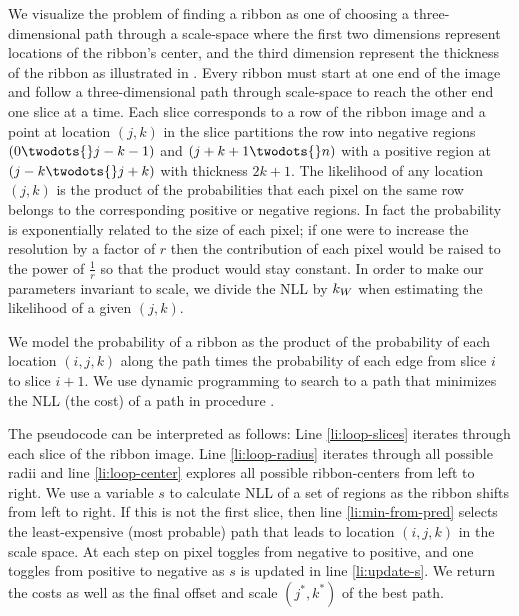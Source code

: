 We visualize the problem of finding a ribbon as one of choosing a three-dimensional path through a scale-space where the first two dimensions represent locations of the ribbon's center, and the third dimension represent the thickness of the ribbon as illustrated in . Every ribbon must start at one end of the image and follow a three-dimensional path through scale-space to reach the other end one slice at a time. Each slice corresponds to a row of the ribbon image and a point at location $(j, k)$ in the slice partitions the row into negative regions $(0\twodots{}j-k-1)$ and $(j+k+1\twodots{}n)$ with a positive region at $(j-k \twodots{} j+k)$ with thickness $2k+1$. The likelihood of any location $(j, k)$ is the product of the probabilities that each pixel on the same row belongs to the corresponding positive or negative regions.  In fact the probability is exponentially related to the size of each pixel; if one were to increase the resolution by a factor of $r$ then the contribution of each pixel would be raised to the power of $\frac{1}{r}$ so that the product would stay constant. In order to make our parameters invariant to scale, we divide the \ac{NLL} by $k_W{}$ when estimating the likelihood of a given $(j,k)$. 

We model the probability of a ribbon as the product of the probability of each location $(i, j, k)$ along the path times the probability of each edge from slice $i$ to slice $i+1$. We use dynamic programming to search to a path that minimizes the \ac{NLL} (the cost) of a path in procedure .

The pseudocode can be interpreted as follows: Line \ref{li:loop-slices} iterates through each slice of the ribbon image. Line \ref{li:loop-radius} iterates through all possible radii and line \ref{li:loop-center} explores all possible ribbon-centers from left to right. We use a variable $s$ to calculate \ac{NLL} of a set of regions as the ribbon shifts from left to right. If this is not the first slice, then line \ref{li:min-from-pred} selects the least-expensive (most probable) path that leads to location $(i, j, k)$ in the scale space.  At each step on pixel toggles from negative to positive, and one toggles from positive to negative as $s$ is updated in line \ref{li:update-s}.  We return the costs as well as the final offset and scale $(j^*, k^*)$ of the best path. 


